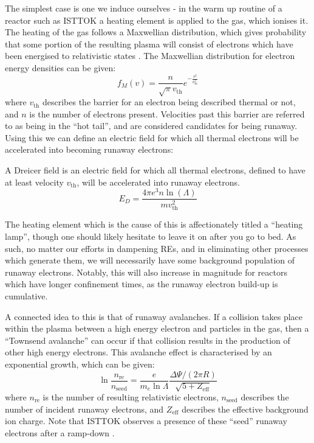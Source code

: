 The simplest case is one we induce ourselves - in the warm up routine of a reactor such as ISTTOK a heating element 
is applied to the gas, which ionises it. The heating of the gas follows a Maxwellian distribution, which 
gives probability that some portion of the resulting plasma will consist of electrons which have been 
energised to relativistic states \cite{runaway-electrons}. The Maxwellian distribution for electron energy densities 
can be given:
$$f_{M}(v) = \frac{n}{\sqrt{\pi} v_{\text{th}}} e^{-\frac{v^2}{v_{\text{th}}^2}}$$
where $v_{\text{th}}$ describes the barrier for an electron being described thermal or not, and $n$ is the number 
of electrons present. Velocities past this barrier are referred to as being in the ``hot tail'', and are considered 
candidates for being runaway. Using this we can define an electric field for which all thermal electrons will be 
accelerated into becoming runaway electrons:
\begin{definition}
    A Dreicer field is an electric field for which all thermal electrons, defined to have at least velocity $v_{\text{th}}$,
    will be accelerated into runaway electrons.
    \begin{equation*}
        E_{D} = \frac{4\pi e^3 n \ln (\Lambda)}{m v_{\text{th}}^2}
    \end{equation*}
\end{definition}
The heating element which is the cause of this is affectionately titled a ``heating lamp'', 
though one should likely hesitate to leave it on after you go to bed. As such, no matter our efforts in dampening 
REs, and in eliminating other processes which generate them, we will necessarily have some background population 
of runaway electrons. Notably, this will also increase in magnitude for reactors which have longer confinement times, as the 
runaway electron build-up is cumulative.

A connected idea to this is that of runaway avalanches. If a collision takes place within the plasma between a high 
energy electron and particles in the gas, then a ``Townsend avalanche'' can occur if that collision results in the production of other 
high energy electrons. This avalanche effect is characterised by an exponential growth, which can be given:
\begin{equation*}
    \ln \frac{n_{\text{re}}}{n_{\text{seed}}} = \frac{e}{m_e \ln \Lambda} \frac{\Delta \Psi / (2\pi R)}{\sqrt{5 + Z_{\text{eff}}}}
\end{equation*}
where $n_{\text{re}}$ is the number of resulting relativistic electrons, $n_{\text{seed}}$ describes the 
number of incident runaway electrons, and $Z_{\text{eff}}$ describes the effective background ion charge. Note that ISTTOK observes a 
presence of these ``seed'' runaway electrons after a ramp-down \cite{malaquias-matthew}.

